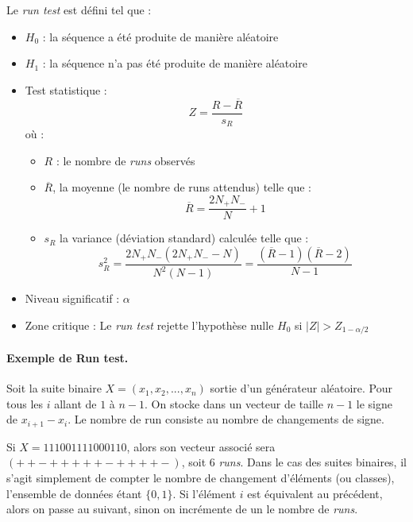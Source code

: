 Le \textit{run test} est défini tel que : 
\begin{itemize}
\item $H_0$ : la séquence a été produite de manière aléatoire
\item $H_1$ : la séquence n'a pas été produite de manière aléatoire
\item Test statistique : 
	$$ Z = \frac{R - \overline{R}}{s_R}$$
	où : 
	\begin{itemize}
	\item $R$ : le nombre de \textit{runs} observés
	\item $\overline{R}$, la moyenne (le nombre de runs attendus) telle que :
	$$\overline{R}= \frac{2 N_+ N_-}{N}+1$$
	\item $s_R$ la variance (déviation standard) calculée telle que : 
	$$s_R^2 = \frac{2 N_+ N_-(2N_+ N_- -N)}{N^2(N-1)} = \frac{(\overline{R}-1)(\overline{R}-2)}{N-1}$$
	\end{itemize}
\item Niveau significatif : $\alpha$
\item Zone critique : Le \textit{run test} rejette l'hypothèse nulle $H_0$ si $ |Z| > Z_{1-\alpha/2}$


\end{itemize}





\paragraph{Exemple de Run test.\\}
Soit la suite binaire $X=(x_1,x_2,...,x_n)$ sortie d'un générateur aléatoire. Pour tous les $i$ allant de $1$ à $n-1$. On stocke dans un vecteur de taille $n-1$ le signe de $x_{i+1}-x_i$. Le nombre de run consiste au nombre de changements de signe.

Si $X=111001111000110$, alors son vecteur associé sera $(++-+++++-++++-)$, soit 6 \textit{runs}. Dans le cas des suites binaires, il s'agit simplement de compter le nombre de changement d'éléments (ou classes), l'ensemble de données étant $\lbrace 0,1 \rbrace$. Si l'élément $i$ est équivalent au précédent, alors on passe au suivant, sinon on incrémente de un le nombre de \textit{runs}.\\

